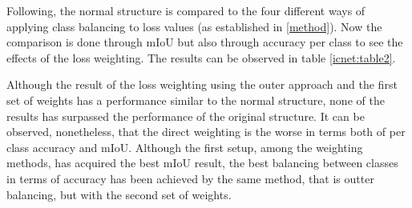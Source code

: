 \documentclass[12pt,a4paper]{article}
\begin{document}
Following, the normal structure is compared to the four different ways of applying class balancing to loss values (as established in \ref{method}). Now the comparison is done through mIoU but also through accuracy per class to see the effects of the loss weighting. The results can be observed in table \ref{icnet:table2}.\newline

\begin{table}[h!]
  \begin{center}
    \caption{Performance results on validation dataset for the normal structure and the architecture with loss weighting for each setup. Here W1 indicates the inverse frequency weithing and W2 the exponential weighting.}
    \label{icnet:table2}
  \end{center}
\end{table}

Although the  result of the loss weighting using the outer approach and the first set of weights has a performance similar to the normal structure, none of the results has surpassed the performance of the original structure. It can be observed, nonetheless, that the direct weighting is the worse in terms both of per class accuracy and mIoU. Although the first setup, among the weighting methods, has acquired the best mIoU result, the best balancing between classes in terms of accuracy has been achieved by the same method, that is outter balancing, but with the second set of weights.\newline
\end{document}
